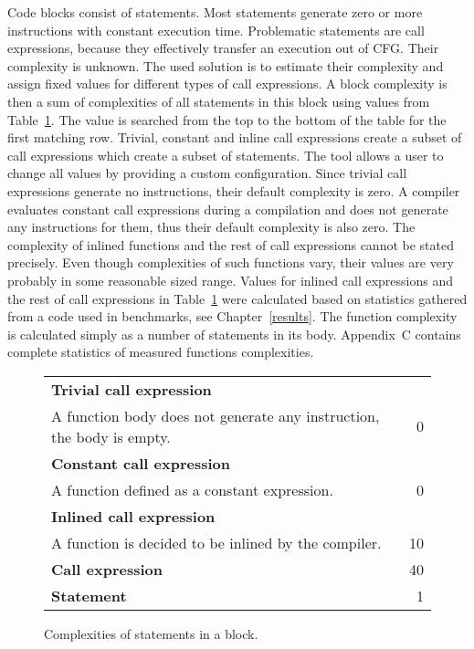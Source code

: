 Code blocks consist of statements. Most statements generate zero or more instructions with constant execution time. Problematic statements are call expressions, because they effectively transfer an execution out of CFG. Their complexity is unknown. The used solution is to estimate their complexity and assign fixed values for different types of call expressions. A block complexity is then a sum of complexities of all statements in this block using values from Table~\ref{yield-block}. The value is searched from the top to the bottom of the table for the first matching row. Trivial, constant and inline call expressions create a subset of call expressions which create a subset of statements. The tool allows a user to change all values by providing a custom configuration. Since trivial call expressions generate no instructions, their default complexity is zero. A compiler evaluates constant call expressions during a compilation and does not generate any instructions for them, thus their default complexity is also zero. The complexity of inlined functions and the rest of call expressions cannot be stated precisely. Even though complexities of such functions vary, their values are very probably in some reasonable sized range. Values for inlined call expressions and the rest of call expressions in Table~\ref{yield-block} were calculated based on statistics gathered from a code used in benchmarks, see Chapter~\ref{results}. The function complexity is calculated simply as a number of statements in its body. Appendix~C contains complete statistics of measured functions complexities.

\begin{figure}[h!]
\caption{Complexities of statements in a block.}
\label{yield-block}
\vspace{0.1cm}
\renewcommand{\arraystretch}{1.1}
\centering
\begin{tabular}{ l | r }
  \textbf{Trivial call expression}\\A function body does not generate any instruction, the body is empty. & 0 \\
  \textbf{Constant call expression}\\A function defined as a constant expression. & 0 \\
  \textbf{Inlined call expression}\\A function is decided to be inlined by the compiler. & 10 \\
  \cellcolor[gray]{0.9}\textbf{Call expression} & \cellcolor[gray]{0.9}40 \\
  \cellcolor[gray]{0.75}\textbf{Statement} & \cellcolor[gray]{0.75}1 \\
\end{tabular}
\end{figure}

